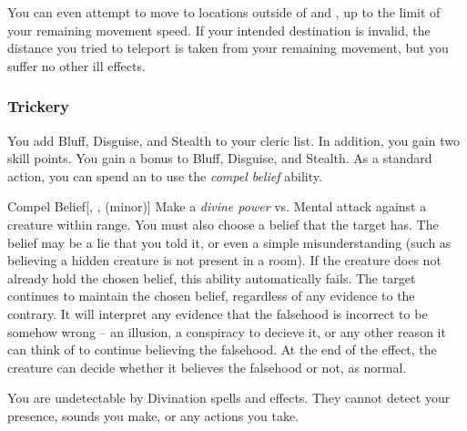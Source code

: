             You can even attempt to move to locations outside of  and , up to the limit of your remaining movement speed.
            If your intended destination is invalid, the distance you tried to teleport is taken from your remaining movement, but you suffer no other ill effects.

        \subsubsection{Trickery}
             You add Bluff, Disguise, and Stealth to your cleric  list.
            In addition, you gain two skill points.
             You gain a  bonus to Bluff, Disguise, and Stealth.
             As a standard action, you can spend an  to use the \textit{compel belief} ability.
            \begin{ability}{Compel Belief}[, ,  (minor)]
                Make a \textit{divine power} vs. Mental attack against a creature within \rngmed range.
                You must also choose a belief that the target has.
                The belief may be a lie that you told it, or even a simple misunderstanding (such as believing a hidden creature is not present in a room).
                If the creature does not already hold the chosen belief, this ability automatically fails.
                \hit The target continues to maintain the chosen belief, regardless of any evidence to the contrary.
                It will interpret any evidence that the falsehood is incorrect to be somehow wrong -- an illusion, a conspiracy to decieve it, or any other reason it can think of to continue believing the falsehood.
                At the end of the effect, the creature can decide whether it believes the falsehood or not, as normal.
            \end{ability}
             You are undetectable by Divination spells and effects.
            They cannot detect your presence, sounds you make, or any actions you take.

